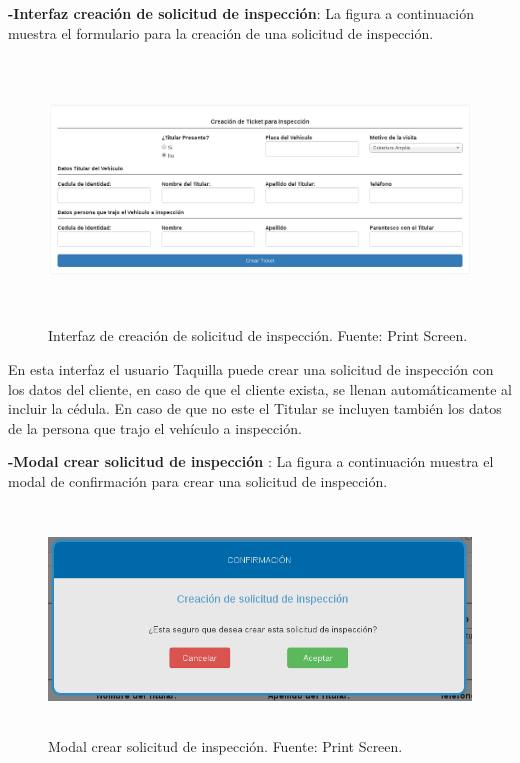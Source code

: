 \textbf{-Interfaz creación de solicitud de inspección}: La figura a continuación muestra el formulario para la creación de una solicitud de inspección.

\begin{figure}[H]
\begin{center}
	\includegraphics[width=\textwidth,height=7cm]{img/interfaces/crear_ticket_solicitud.png}
\end{center}
\caption{Interfaz de creación de solicitud de inspección. Fuente: Print Screen.}
\label{fig:interfaz_crear_solicitud_inspeccion}
\end{figure}

En esta interfaz el usuario Taquilla puede crear una solicitud de inspección con los datos del cliente, en caso de que el cliente exista, se llenan automáticamente al incluir la cédula. En caso de que no este el Titular se incluyen también los datos de la persona que trajo el vehículo a inspección.


\textbf{-Modal crear solicitud de inspección }: La figura a continuación muestra el modal de confirmación para crear una solicitud de inspección.

\begin{figure}[H]
\begin{center}
	\includegraphics[width=14cm,height=6cm]{img/interfaces/modal_confirmar_creacion_solicitud.png}
\end{center}
\caption{Modal crear solicitud de inspección. Fuente: Print Screen.}
\label{fig:modal_confirmacion_crear_solicitud}
\end{figure}



